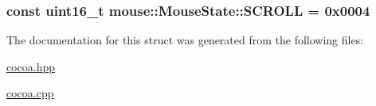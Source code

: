\hypertarget{structmouse_1_1_mouse_state_a09e8666395882198d1bca0a745f216df}{
\subsubsection[{S\-C\-R\-O\-L\-L}]{\setlength{\rightskip}{0pt plus 5cm}const uint16\-\_\-t {\bf mouse\-::\-Mouse\-State\-::\-S\-C\-R\-O\-L\-L} = 0x0004}}\label{structmouse_1_1_mouse_state_a09e8666395882198d1bca0a745f216df}


The documentation for this struct was generated from the following files\-:\begin{DoxyCompactItemize}
\item 
\hyperlink{cocoa_8hpp}{cocoa.\-hpp}\item 
\hyperlink{cocoa_8cpp}{cocoa.\-cpp}\end{DoxyCompactItemize}
